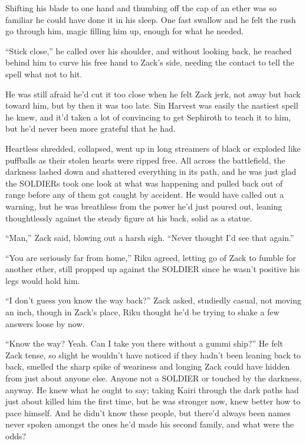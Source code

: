 Shifting his blade to one hand and thumbing off the cap of an ether was so familiar he could have done it in his sleep. One fast swallow and he felt the rush go through him, magic filling him up, enough for what he needed.

``Stick close,'' he called over his shoulder, and without looking back, he reached behind him to curve his free hand to Zack's side, needing the contact to tell the spell what not to hit.

He was still afraid he'd cut it too close when he felt Zack jerk, not away but back toward him, but by then it was too late. Sin Harvest was easily the nastiest spell he knew, and it'd taken a lot of convincing to get Sephiroth to teach it to him, but he'd never been more grateful that he had.

Heartless shredded, collapsed, went up in long streamers of black or exploded like puffballs as their stolen hearts were ripped free. All across the battlefield, the darkness lashed down and shattered everything in its path, and he was just glad the SOLDIERs took one look at what was happening and pulled back out of range before any of them got caught by accident. He would have called out a warning, but he was breathless from the power he'd just poured out, leaning thoughtlessly against the steady figure at his back, solid as a statue.

``Man,'' Zack said, blowing out a harsh sigh. ``Never thought I'd see that again.''

``You are seriously far from home,'' Riku agreed, letting go of Zack to fumble for another ether, still propped up against the SOLDIER since he wasn't positive his legs would hold him.

``I don't guess you know the way back?'' Zack asked, studiedly casual, not moving an inch, though in Zack's place, Riku thought he'd be trying to shake a few answers loose by now.

``Know the way? Yeah. Can I take you there without a gummi ship?'' He felt Zack tense, so slight he wouldn't have noticed if they hadn't been leaning back to back, smelled the sharp spike of weariness and longing Zack could have hidden from just about anyone else. Anyone not a SOLDIER or touched by the darkness, anyway. He knew what he ought to say; taking Kairi through the dark paths had just about killed him the first time, but he was stronger now, knew better how to pace himself. And he didn't know these people, but there'd always been names never spoken amongst the ones he'd made his second family, and what were the odds?

